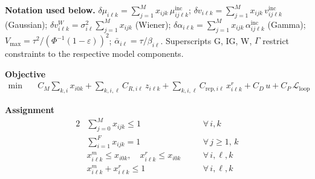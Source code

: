 \documentclass[11pt,a4paper]{article}
\begin{document}
\begin{small}
\allowdisplaybreaks

\textbf{Notation used below.}
$\delta\mu_{i\ell k} = \sum_{j=1}^{M} x_{ijk}\,\mu^{\mathrm{inc}}_{ij\ell k}$;
$\delta v_{i\ell k} = \sum_{j=1}^{M} x_{ijk}\,v^{\mathrm{inc}}_{ij\ell k}$ (Gaussian);
$\delta v^W_{i\ell k} = \sigma^2_{i\ell}\sum_{j=1}^{M} x_{ijk}$ (Wiener);
$\delta\alpha_{i\ell k} = \sum_{j=1}^{M} x_{ijk}\,\alpha^{\mathrm{inc}}_{ij\ell k}$ (Gamma);
$V_{\max} = \tau^2/(\Phi^{-1}(1-\varepsilon))^2$;
$\bar{\alpha}_{i\ell} = \tau/\beta_{i\ell}$.
Superscripts G, IG, W, $\Gamma$ restrict constraints to the respective model components.

\vspace{0.5em}
\noindent\textbf{Objective}
\begin{align}
\min\quad
  & C_M \sum_{k,i} x_{i0k}
  + \sum_{k,i,\ell} C_{R,i\ell}\,z_{i\ell k}
  + \sum_{k,i,\ell} C_{\mathrm{rep},i\ell}\,x^r_{i\ell k}
  + C_D\,u
  + C_P\,\mathcal{L}_{\mathrm{loop}} \tag{OBJ}
\end{align}

\vspace{0.3em}
\noindent\textbf{Assignment}
\begin{alignat}{2}
  &\textstyle\sum_{j=0}^{M} x_{ijk} \leq 1
  &&\quad\forall\,i,k \tag{one activity per train} \\
  &\textstyle\sum_{i=1}^{F} x_{ijk} = 1
  &&\quad\forall\,j\geq 1,\,k \tag{mission coverage} \\
  &x^m_{i\ell k} \leq x_{i0k},\quad x^r_{i\ell k} \leq x_{i0k}
  &&\quad\forall\,i,\ell,k \tag{maintenance on maint.\ day} \\
  &x^m_{i\ell k} + x^r_{i\ell k} \leq 1
  &&\quad\forall\,i,\ell,k \tag{no simultaneous repair+replace}
\end{alignat}


\end{small}
\end{document}
